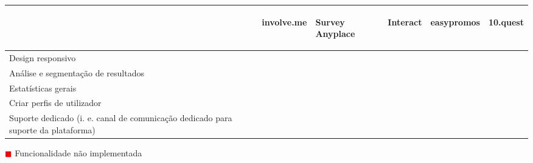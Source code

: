 \renewcommand{\arraystretch}{2}
\setlength\arrayrulewidth{1pt}
\begin{table}[!ht]  
	\begin{center}
		\begin{tabular}{|p{3cm}|p{0cm}|p{0cm}|p{0cm}|p{0cm}|p{0cm}|}
			\cline{2-6}
			\multicolumn{1}{c|}{} & \hspace{0.2cm}\begin{sideways}involve.me\end{sideways} & \hspace{0.4cm}\begin{sideways}Survey Anyplace\end{sideways} & \hspace{0.2cm}\begin{sideways}Interact\end{sideways}&
			\hspace{0.2cm}\begin{sideways}easypromos\end{sideways}&
			\hspace{0.2cm}\begin{sideways} 10.quest\end{sideways}\\ \hline
			
			Design responsivo & \cellcolor{green!80}  & \cellcolor{green!80} & \cellcolor{green!80} & \cellcolor{green!80}  & \cellcolor{green!80}  \\ \hline			
			
			Análise e segmentação de resultados & \cellcolor{green!80}  & \cellcolor{green!80}  & \cellcolor{green!80} & \cellcolor{green!80} & \cellcolor{green!80}  \\ \hline
			
			Estatísticas gerais & \cellcolor{yellow!80}  & \cellcolor{red!80}  & \cellcolor{red!80} & \cellcolor{red!80} & \cellcolor{green!80} \\ \hline
			
			Criar perfis de utilizador & \cellcolor{red!80}  & \cellcolor{red!80}  & \cellcolor{red!80} & \cellcolor{red!80} & \cellcolor{green!80}  \\ \hline
			
			Suporte dedicado (i. e. canal de comunicação dedicado para suporte da plataforma)		 & \cellcolor{green!80}  & \cellcolor{green!80}  & \cellcolor{green!80} & \cellcolor{green!80} & \cellcolor{green!80}  \\ \hline
			
		\end{tabular}
		\end{center}
	\hspace{1.2cm}	\textcolor{red}{$\blacksquare$} Funcionalidade não implementada


\end{table}
